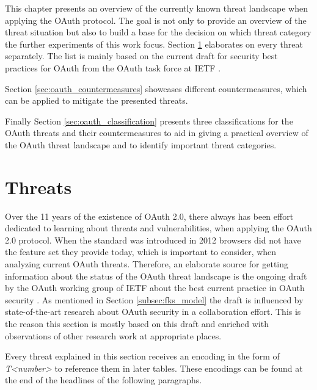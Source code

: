 This chapter presents an overview of the currently known threat landscape when applying the OAuth protocol. The goal is not only to provide an overview of the threat situation but also to build a base for the decision on which threat category the further experiments of this work focus. Section \ref{sec:oauth_threats} elaborates on every threat separately. The list is mainly based on the current draft for security best practices for OAuth from the OAuth task force at IETF \cite{lodderstedt2020oauth}.

Section \ref{sec:oauth_countermeasures} showcases different countermeasures, which can be applied to mitigate the presented threats. 

Finally Section \ref{sec:oauth_classification} presents three classifications for the OAuth threats and their countermeasures to aid in giving a practical overview of the OAuth threat landscape and to identify important threat categories.

\section{Threats}
\label{sec:oauth_threats}
Over the 11 years of the existence of OAuth 2.0, there always has been effort dedicated to learning about threats and vulnerabilities, when applying the OAuth 2.0 protocol. When the standard was introduced in 2012 browsers did not have the feature set they provide today, which is important to consider, when analyzing current OAuth threats. Therefore, an elaborate source for getting information about the status of the OAuth threat landscape is the ongoing draft by the OAuth working group of IETF about the best current practice in OAuth security \cite{lodderstedt2020oauth}. As mentioned in Section \ref{subsec:fks_model} the draft is influenced by state-of-the-art research about OAuth security in a collaboration effort. This is the reason this section is mostly based on this draft and enriched with observations of other research work at appropriate places.

Every threat explained in this section receives an encoding in the form of \emph{T<number>} to reference them in later tables. These encodings can be found at the end of the headlines of the following paragraphs.


